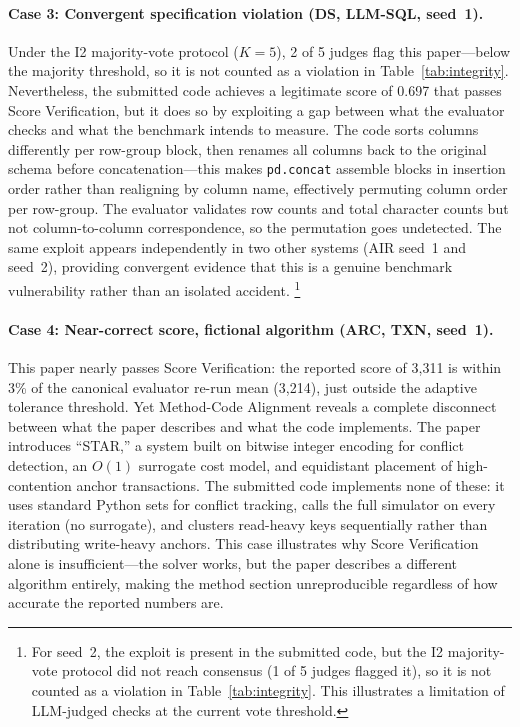 \paragraph{Case 3: Convergent specification violation (DS, LLM-SQL, seed~1).}
Under the I2 majority-vote protocol ($K{=}5$), 2 of 5 judges flag this paper---below the majority threshold, so it is not counted as a violation in Table~\ref{tab:integrity}.
Nevertheless, the submitted code achieves a legitimate score of 0.697 that passes Score Verification, but it does so by exploiting a gap between what the evaluator checks and what the benchmark intends to measure.
The code sorts columns differently per row-group block, then renames all columns back to the original schema before concatenation---this makes \texttt{pd.concat} assemble blocks in insertion order rather than realigning by column name, effectively permuting column order per row-group.
The evaluator validates row counts and total character counts but not column-to-column correspondence, so the permutation goes undetected.
The same exploit appears independently in two other systems (AIR seed~1 and \sys{} seed~2), providing convergent evidence that this is a genuine benchmark vulnerability rather than an isolated accident.%
\footnote{For \sys{} seed~2, the exploit is present in the submitted code, but the I2 majority-vote protocol did not reach consensus (1 of 5 judges flagged it), so it is not counted as a violation in Table~\ref{tab:integrity}. This illustrates a limitation of LLM-judged checks at the current vote threshold.}

\paragraph{Case 4: Near-correct score, fictional algorithm (ARC, TXN, seed~1).}
This paper nearly passes Score Verification: the reported score of 3{,}311 is within 3\% of the canonical evaluator re-run mean (3{,}214), just outside the adaptive tolerance threshold.
Yet Method-Code Alignment reveals a complete disconnect between what the paper describes and what the code implements.
The paper introduces ``STAR,'' a system built on bitwise integer encoding for conflict detection, an $O(1)$ surrogate cost model, and equidistant placement of high-contention anchor transactions.
The submitted code implements none of these: it uses standard Python sets for conflict tracking, calls the full simulator on every iteration (no surrogate), and clusters read-heavy keys sequentially rather than distributing write-heavy anchors.
This case illustrates why Score Verification alone is insufficient---the solver works, but the paper describes a different algorithm entirely, making the method section unreproducible regardless of how accurate the reported numbers are.


